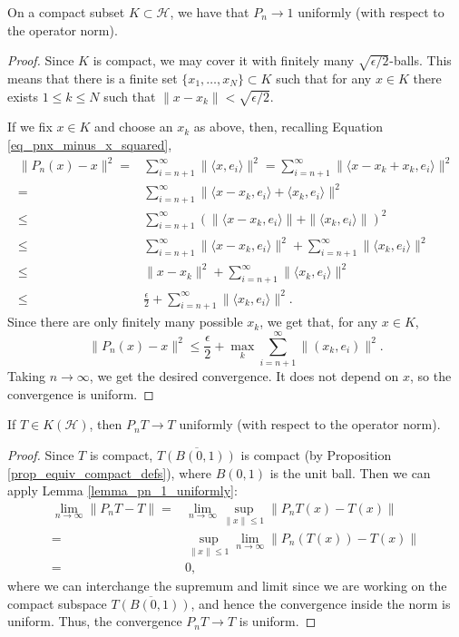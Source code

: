 \documentclass[12pt]{article}
\begin{document}
\begin{lemma}
\label{lemma_pn_1_uniformly}
	On a compact subset $K\subset \mathcal{H}$, we have that $P_n\to 1$ uniformly (with respect to the operator norm).
\end{lemma}
\begin{proof}
Since $K$ is compact, we may cover it with finitely many $\sqrt{\epsilon /2}$-balls. This means that there is a finite set $\{x_1,\dots, x_N\}\subset K$ such that for any $x\in K$ there exists $1\leq k\leq N$ such that $\|x-x_k\|<\sqrt{\epsilon /2}$. 

	If we fix $x\in K$ and choose an $x_k$ as above, then, recalling Equation \ref{eq_pnx_minus_x_squared},
	\begin{align*}
		\|P_n(x)-x\|^2 =& \sum_{i=n+1}^\infty\|\langle x,e_i \rangle\|^2 = \sum_{i=n+1}^\infty \|\langle x-x_k+x_k,e_i \rangle\|^2 \\
		=& \sum_{i=n+1}^\infty\|\langle x-x_k,e_i \rangle + \langle x_k,e_i \rangle \|^2 \\
		\leq& \sum_{i=n+1}^\infty (\| \langle x-x_k,e_i \rangle \|+\| \langle x_k,e_i \rangle \|)^2 \\
		\leq& \sum_{i=n+1}^\infty \| \langle x-x_k,e_i \rangle \|^2 + \sum_{i=n+1}^\infty \| \langle x_k,e_i \rangle \|^2 \\
		\leq& \|x-x_k\|^2 + \sum_{i=n+1}^\infty \| \langle x_k,e_i \rangle \|^2 \\
		\leq& \frac{\epsilon}{2} + \sum_{i=n+1}^\infty \| \langle x_k,e_i \rangle \|^2.
	\end{align*}
	Since there are only finitely many possible $x_k$, we get that, for any $x\in K$,
	\[
		\|P_n(x)-x\|^2 \leq \frac{\epsilon}{2}+ \max_{k}\sum_{i=n+1}^\infty \|(x_k,e_i)\|^2.
	\]
	Taking $n\to\infty$, we get the desired convergence. It does not depend on $x$, so the convergence is uniform.
\end{proof}

\begin{corollary}
\label{cor_pnt_t}
If $T\in K(\mathcal{H})$, then $P_nT\to T$ uniformly (with respect to the operator norm).
\end{corollary}
\begin{proof}
	Since $T$ is compact, $\overline{T(B(0,1))}$ is compact (by Proposition \ref{prop_equiv_compact_defs}), where $B(0,1)$ is the unit ball. Then we can apply Lemma \ref{lemma_pn_1_uniformly}:
	\begin{align*}
		\lim_{n\to\infty}\|P_n T-T\| =& \lim_{n\to\infty}\sup_{\|x\|\leq 1} \|P_nT(x) - T(x)\| \\
		=& \sup_{\|x\|\leq 1}\lim_{n\to\infty}\|P_n(T(x))-T(x)\| \\
		=& 0,
	\end{align*}
	where we can interchange the supremum and limit since we are working on the compact subspace $\overline{T(B(0,1))}$, and hence the convergence inside the norm is uniform. Thus, the convergence $P_nT\to T$ is uniform.
\end{proof}
\end{document}
